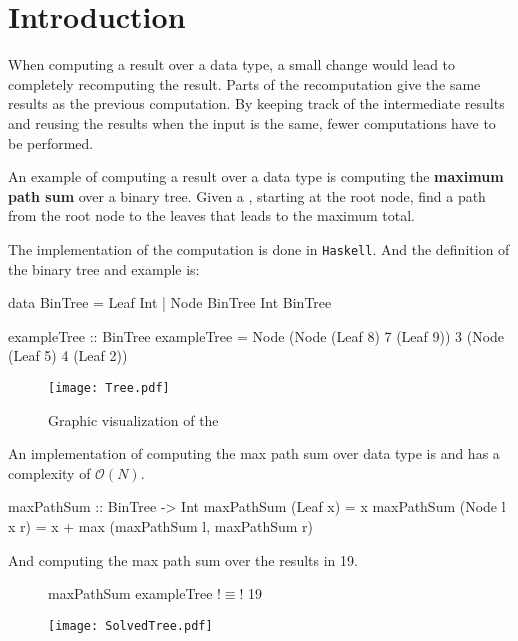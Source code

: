 \newpage
\section{Introduction}
When computing a result over a data type, a small change would lead to completely recomputing the result. Parts of the recomputation give the same results as the previous computation. By keeping track of the intermediate results and reusing the results when the input is the same, fewer computations have to be performed. 

An example of computing a result over a data type is computing the \textbf{maximum path sum} over a binary tree. Given a , starting at the root node, find a path from the root node to the leaves that leads to the maximum total.

The implementation of the computation is done in \texttt{Haskell}. And the definition of the binary tree and example is:
\begin{haskell}
data BinTree = Leaf Int
             | Node BinTree Int BinTree 
\end{haskell}

\begin{haskell}
exampleTree :: BinTree    
exampleTree = Node (Node (Leaf 8) 7 (Leaf 9)) 3 (Node (Leaf 5) 4 (Leaf 2))
\end{haskell}

\begin{figure}[H]
    \centering
    \texttt{[image: Tree.pdf]}
    \caption{Graphic visualization of the }
\end{figure}

An implementation of computing the max path sum over data type  is and has a complexity of $\mathcal{O}(N)$.
\begin{haskell}
maxPathSum :: BinTree -> Int
maxPathSum (Leaf x)     = x
maxPathSum (Node l x r) = x + max (maxPathSum l, maxPathSum r)
\end{haskell}

\newpage
And computing the max path sum over the  results in 19.

\begin{figure}[H]
\begin{minipage}[c]{0.35\textwidth}
\begin{haskell}
maxPathSum exampleTree !$\equiv$! 19
\end{haskell}
\end{minipage}
\hspace{0.1\textwidth}
\begin{minipage}[c]{0.55\textwidth}
\texttt{[image: SolvedTree.pdf]}
\end{minipage}
\end{figure}


